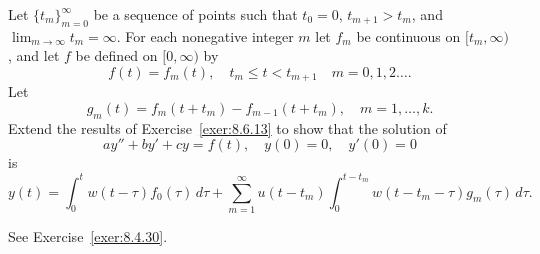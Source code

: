 \documentclass{ximera}
\begin{document}
\begin{problem}\label{exer:8.6.14}
Let $\{t_m\}_{m=0}^\infty$  be a sequence of points such that $t_0=0$,
$t_{m+1}>t_m$,
and $\lim_{m\to\infty}t_m=\infty$. For each nonegative integer $m$
let $f_m$ be continuous on $[t_m,\infty)$, and let
 $f$ be defined on $[0,\infty)$ by
$$
f(t)=f_m(t),\quad t_m\le t<t_{m+1}\quad  m=0,1,2\dots.
$$
Let
$$
g_m(t)=f_m(t+t_m)-f_{m-1}(t+t_m),\quad  m=1,\dots,k.
$$
Extend the results of Exercise~\ref{exer:8.6.13} to show that the solution
of
$$
ay''+by'+cy=f(t),\quad y(0)=0,\quad y'(0)=0
$$
is
$$
y(t)=\int_0^t w(t-\tau)f_0(\tau)\,d\tau+\sum_{m=1}^\infty u(t-t_m)
\int_0^{t-t_m}w(t-t_m-\tau)g_m(\tau)
\,d\tau.
$$
\begin{hint}
  See Exercise~\ref{exer:8.4.30}. 
\end{hint}

\end{problem}
\end{document}
